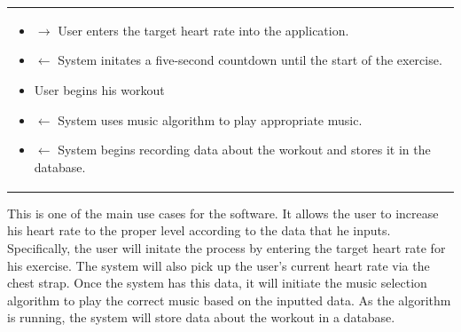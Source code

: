 \documentclass[letterpaper,english, 12pt]{scrreprt}
\begin{document}
\begin{center}
\begin{tabular}{|C{15cm}|}
\begin{flushleft}
                        \end{flushleft}
                                \begin{itemize}
                                        \item $\rightarrow$ User enters the target heart rate into the application.
                                        \item $\leftarrow$ System initates a five-second countdown until the start of the exercise.
                                        \item User begins his workout
                                        \item $\leftarrow$ System uses music algorithm to play appropriate music.
                                        \item $\leftarrow$ System begins recording data about the workout and stores it in the database.
                                \end{itemize}
               	\hline
        \end{tabular}
\end{center}

This is one of the main use cases for the software. It allows the user to increase his heart rate to the proper level according to the data that he inputs. Specifically, the user will initate the process by entering the target heart rate for his exercise. The system will also pick up the user's current heart rate via the chest strap. Once the system has this data, it will initiate the music selection algorithm to play the correct music based on the inputted data. As the algorithm is running, the system will store data about the workout in a database.
\end{document}
